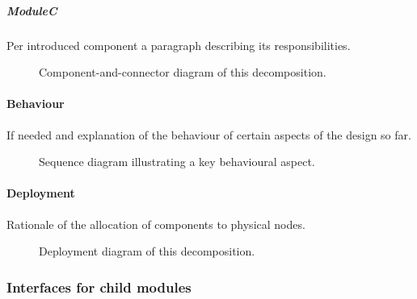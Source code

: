 \documentclass[a4paper,10pt]{article}
\begin{document}
\subparagraph{ModuleC}
Per introduced component a paragraph describing its responsibilities.

\begin{figure}[!htp]
	\centering
	\caption{Component-and-connector diagram of this decomposition.
	}\label{fig:it1-cc_main}
\end{figure}

\paragraph{Behaviour}
If needed and explanation of the behaviour of certain aspects of the design so
far.

\begin{figure}[!htp]
	\centering
	\caption{Sequence diagram illustrating a key behavioural aspect.
	}\label{fig:it1-seq_aspect1}
\end{figure}

\paragraph{Deployment}
Rationale of the allocation of components to physical nodes.

\begin{figure}[!htp]
	\centering
	\caption{Deployment diagram of this decomposition.
	}\label{fig:it1-depl_main}
\end{figure}

\subsubsection{Interfaces for child modules}
\end{document}

